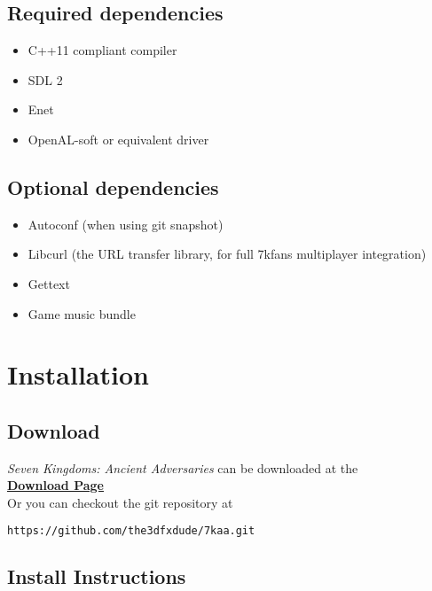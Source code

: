 \subsection{Required dependencies}

\begin{itemize}
\item C++11 compliant compiler
\item SDL 2
\item Enet
\item OpenAL-soft or equivalent driver
\end{itemize}

\subsection{Optional dependencies}

\begin{itemize}
\item Autoconf (when using git snapshot)
\item Libcurl (the URL transfer library, for full 7kfans multiplayer integration)
\item Gettext
\item Game music bundle
\end{itemize}

\section{Installation}

\subsection{Download}

\textit{Seven Kingdoms: Ancient Adversaries} can be downloaded at the \\

\href{https://www.7kfans.com/wiki/index.php/Download}{\textbf{Download Page}} \\

Or you can checkout the git repository at \\

\begin{lstlisting}[language=bash]
https://github.com/the3dfxdude/7kaa.git
\end{lstlisting}

\subsection{Install Instructions}

